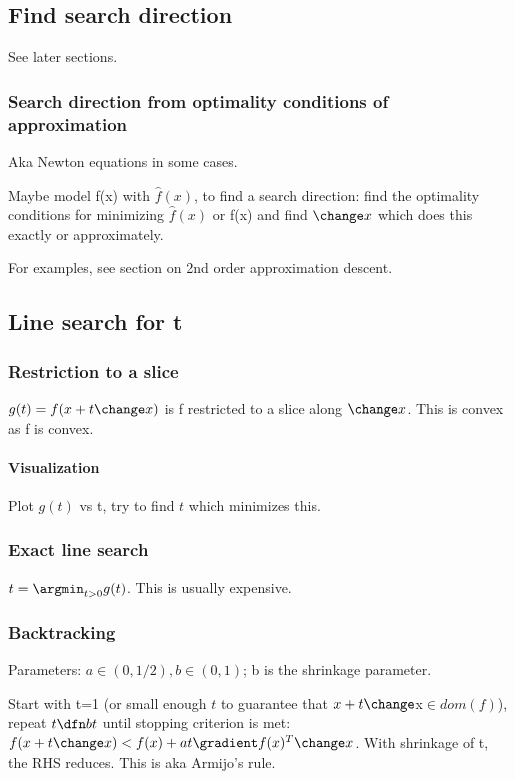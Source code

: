 \documentclass[oneside, article]{memoir}
\begin{document}
\subsection{Find search direction}
\label{descent:Search Direction}
See later sections.

\subsubsection{Search direction from optimality conditions of approximation}
Aka Newton equations in some cases.

Maybe model f(x) with $\hat{f}(x)$, to find a search direction: find the optimality conditions for minimizing $\hat{f}(x)$ or f(x) and find $\change x$ which does this exactly or approximately.

For examples, see section on 2nd order approximation descent.

\subsection{Line search for t}
\subsubsection{Restriction to a slice}
$g(t) = f(x+ t \change x)$ is f restricted to a slice along $\change x$. This is convex as f is convex.

\paragraph*{Visualization}
Plot $g(t)$ vs t, try to find $t$ which minimizes this.

\subsubsection{Exact line search}
$t = \argmin_{t>0} g(t)$. This is usually expensive.

\subsubsection{Backtracking}
Parameters: $a \in (0, 1/2), b \in (0, 1)$; b is the shrinkage parameter.

Start with t=1 (or small enough $t$ to guarantee that $x + t\change $x$ \in dom(f)$), repeat $t \dfn bt$ until stopping criterion is met:
$f(x + t \change x) < f(x) + at\gradient f(x)^{T} \change x$. With shrinkage of t, the RHS reduces. This is aka Armijo's rule.
\end{document}
